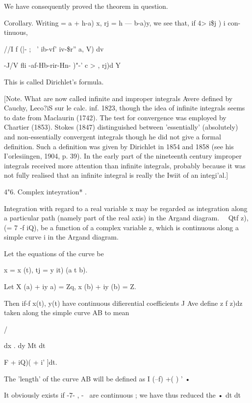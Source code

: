 We have consequently proved the theorem in question. 

Corollary. Writing   = a +  h-a) x, rj = h —  b-a)y, we see that, if 4> i\$j  ) i  con- 
tinuous, 

//I  f  (|- ; ~' ib-vf' iv-\$r''  a, V) dv  

-J/V  fli -af-Hb-rir-Hn- )"-' c >  , rj)d Y 

This is called Dirichlet's formula. 

[Note. What are now called infinite and improper integrals Avere defined by Cauchy, 
Leco?iS sur le calc. inf. 1823, though the idea of infinite integrals seems to date from 
Maclaurin (1742). The test for convergence was employed by Chartier (1853). Stokes 
(1847) distinguished between 'essentially' (absolutely) and non-essentially convergent 
integrals though he did not give a formal definition. Such a definition was given by 
Dirichlet in 1854 and 1858 (see his I'orlesiingen, 1904, p. 39). In the early part of the 
nineteenth century improper integrals received more attention than infinite integrals, 
probably because it was not fully realised that an infinite integral is really the Iwiit 
of an integi'al.] 

4"6. Complex inteyration* . 

Integration with regard to a real variable x may be regarded as integration 
along a particular path (namely part of the real axis) in the Argand diagram. 
\ \  Qtf z), (= 7  -f iQ), be a function of a complex variable z, which is continuous 
along a simple curve  i  in the Argand diagram. 

Let the equations of the curve be 

x = x (t), tj = y it) (a  t b). 

Let X (a) + iy  a) = Zq, x (b) + iy (b) = Z. 

Then if-f x(t), y(t) have continuous difierential coefficients J Ave define 
z 
f z)dz taken along the simple curve AB to mean 



/ 



dx . dy 
Mt dt 



 F + iQ)(  + i' ]dt. 



The 'length' of the curve AB will be defined as I \/ (--f) +( ) ' • 

It obviously exists if -7- , -~ are continuous ; we have thus reduced the 
•  dt dt 

